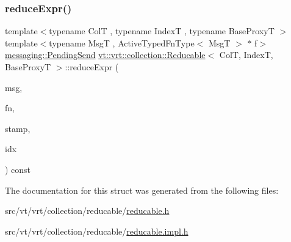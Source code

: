 \subsubsection{\texorpdfstring{reduce\+Expr()}{reduceExpr()}\hspace{0.1cm}{\footnotesize\ttfamily [2/2]}}
{\footnotesize\ttfamily template$<$typename ColT , typename IndexT , typename Base\+ProxyT $>$ \\
template$<$typename MsgT , Active\+Typed\+Fn\+Type$<$ Msg\+T $>$ $\ast$ f$>$ \\
\hyperlink{structvt_1_1messaging_1_1_pending_send}{messaging\+::\+Pending\+Send} \hyperlink{structvt_1_1vrt_1_1collection_1_1_reducable}{vt\+::vrt\+::collection\+::\+Reducable}$<$ ColT, IndexT, Base\+ProxyT $>$\+::reduce\+Expr (\begin{DoxyParamCaption}\item[{MsgT $\ast$const}]{msg,  }\item[{\hyperlink{structvt_1_1vrt_1_1collection_1_1_reducable_a9f5a6c385efafe1fa52937f4809a9486}{Reduce\+Idx\+Func\+Type}}]{fn,  }\item[{\hyperlink{structvt_1_1vrt_1_1collection_1_1_reducable_a19f80baf23f36dad4948ef07322fd0cb}{Reduce\+Stamp}}]{stamp,  }\item[{IndexT const \&}]{idx }\end{DoxyParamCaption}) const}



The documentation for this struct was generated from the following files\+:\begin{DoxyCompactItemize}
\item 
src/vt/vrt/collection/reducable/\hyperlink{reducable_8h}{reducable.\+h}\item 
src/vt/vrt/collection/reducable/\hyperlink{reducable_8impl_8h}{reducable.\+impl.\+h}\end{DoxyCompactItemize}
